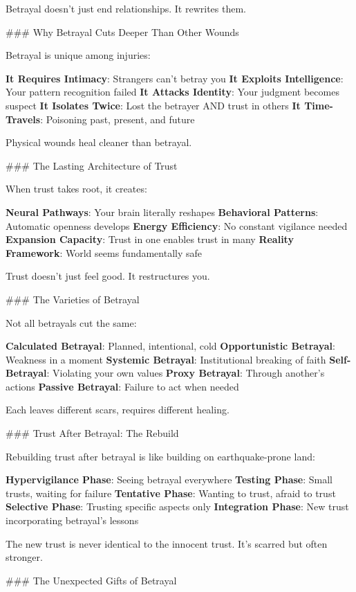 \documentclass[12pt]{book}
\begin{document}
Betrayal doesn't just end relationships. It rewrites them.

\#\#\# Why Betrayal Cuts Deeper Than Other Wounds

Betrayal is unique among injuries:

\textbf{It Requires Intimacy}: Strangers can't betray you
\textbf{It Exploits Intelligence}: Your pattern recognition failed
\textbf{It Attacks Identity}: Your judgment becomes suspect
\textbf{It Isolates Twice}: Lost the betrayer AND trust in others
\textbf{It Time-Travels}: Poisoning past, present, and future

Physical wounds heal cleaner than betrayal.

\#\#\# The Lasting Architecture of Trust

When trust takes root, it creates:

\textbf{Neural Pathways}: Your brain literally reshapes
\textbf{Behavioral Patterns}: Automatic openness develops
\textbf{Energy Efficiency}: No constant vigilance needed
\textbf{Expansion Capacity}: Trust in one enables trust in many
\textbf{Reality Framework}: World seems fundamentally safe

Trust doesn't just feel good. It restructures you.

\#\#\# The Varieties of Betrayal

Not all betrayals cut the same:

\textbf{Calculated Betrayal}: Planned, intentional, cold
\textbf{Opportunistic Betrayal}: Weakness in a moment
\textbf{Systemic Betrayal}: Institutional breaking of faith
\textbf{Self-Betrayal}: Violating your own values
\textbf{Proxy Betrayal}: Through another's actions
\textbf{Passive Betrayal}: Failure to act when needed

Each leaves different scars, requires different healing.

\#\#\# Trust After Betrayal: The Rebuild

Rebuilding trust after betrayal is like building on earthquake-prone land:

\textbf{Hypervigilance Phase}: Seeing betrayal everywhere
\textbf{Testing Phase}: Small trusts, waiting for failure
\textbf{Tentative Phase}: Wanting to trust, afraid to trust
\textbf{Selective Phase}: Trusting specific aspects only
\textbf{Integration Phase}: New trust incorporating betrayal's lessons

The new trust is never identical to the innocent trust. It's scarred but often stronger.

\#\#\# The Unexpected Gifts of Betrayal
\end{document}
